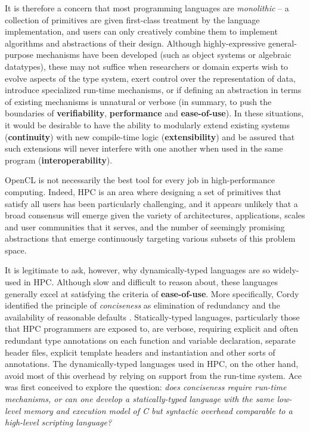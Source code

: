 \documentclass[9pt,preprint]{sigplanconf}
\begin{document}
It is therefore a concern that most programming languages are {\em monolithic} -- a collection of primitives are given first-class treatment by the language implementation, and users can only creatively combine them to implement algorithms and abstractions of their design. Although highly-expressive general-purpose mechanisms have been developed (such as object systems or algebraic datatypes), these may not suffice when researchers or domain experts wish to evolve aspects of the type system, exert control over the representation of data, introduce specialized run-time mechanisms, or if defining an abstraction in terms of existing mechanisms is unnatural or verbose (in summary, to push the boundaries of \textbf{verifiability}, \textbf{performance} and \textbf{ease-of-use}). In these situations, it would be desirable to have the ability to modularly extend existing systems (\textbf{continuity}) with new compile-time logic (\textbf{extensibility}) and be assured that such extensions will never interfere with one another when used in the same program (\textbf{interoperability}).

OpenCL is not necessarily the best tool for every job in high-performance computing. Indeed, HPC is an area where designing a set of primitives that satisfy all users has been particularly challenging, and it appears unlikely that a broad consensus will emerge given the variety of architectures, applications, scales and user communities that it serves, and the number of seemingly promising abstractions that emerge continuously targeting various subsets of this problem space.

It is legitimate to ask, however, why dynamically-typed languages are so widely-used in HPC. Although slow and difficult to reason about, these languages generally excel at satisfying the criteria of \textbf{ease-of-use}. More specifically, Cordy identified the principle of \emph{conciseness} as elimination of
redundancy and the availability of reasonable defaults \cite{cordy1992hints}. Statically-typed languages, particularly those that HPC programmers are exposed to, are verbose, requiring explicit and often redundant type annotations on each function and variable declaration, separate header files, explicit template headers and  instantiation and other sorts of annotations.  The dynamically-typed languages used in HPC, on the other hand, avoid most of this overhead by relying on support from the run-time system. Ace was first conceived to explore the question: \emph{does conciseness require run-time mechanisms, or can one develop a statically-typed language with the same low-level memory and execution model of C but syntactic overhead comparable to a high-level scripting language? }
\end{document}
